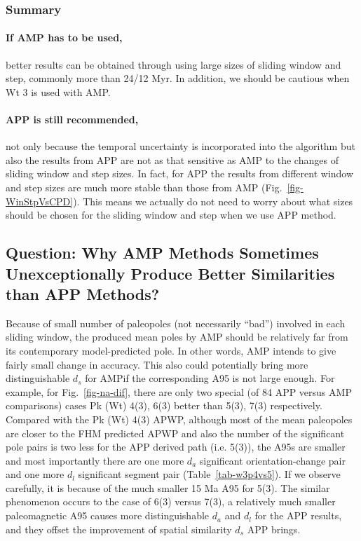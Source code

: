 \subsubsection{Summary}

\paragraph{If AMP has to be used,} better results can be obtained through
using large sizes of sliding window and step, commonly more than 24/12 Myr. In
addition, we should be cautious when Wt 3 is used with AMP\@.

\paragraph{APP is still recommended,} not only because the temporal uncertainty
is incorporated into the algorithm but also the results from APP are not as that
sensitive as AMP to the changes of sliding window and step sizes. In fact, for
APP the results from different window and step sizes are much more stable than
those from AMP (Fig.~\ref{fig-WinStpVsCPD}). This means we actually do not need
to worry about what sizes should be chosen for the sliding window and step when
we use APP method.

\subsection{Question: Why AMP Methods Sometimes Unexceptionally Produce Better
Similarities than APP Methods?}

Because of small number of paleopoles (not necessarily ``bad'') involved in each
sliding window, the produced mean poles by AMP should be relatively far from its
contemporary model-predicted pole. In other words, AMP intends to give fairly
small change in accuracy. This also could potentially bring more distinguishable
$d_s$ for AMP\@ if the corresponding A95 is not large enough. For example, for
Fig.~\ref{fig-na-dif}, there are only two special (of 84 APP versus AMP
comparisons) cases Pk (Wt) 4(3), 6(3) better than 5(3), 7(3) respectively.
Compared with the Pk (Wt) 4(3) APWP, although most of the mean paleopoles are
closer to the FHM predicted APWP and also the number of the significant pole
pairs is two less for the APP derived path (i.e. 5(3)), the A95s are smaller and
most importantly there are one more $d_a$ significant orientation-change pair
and one more $d_l$ significant segment pair (Table~\ref{tab-w3p4vs5}). If we
observe carefully, it is because of the much smaller 15 Ma A95 for 5(3). The
similar phenomenon occurs to the case of 6(3) versus 7(3), a relatively much
smaller paleomagnetic A95 causes more distinguishable $d_a$ and $d_l$ for the
APP results, and they offset the improvement of spatial similarity $d_s$ APP
brings.

